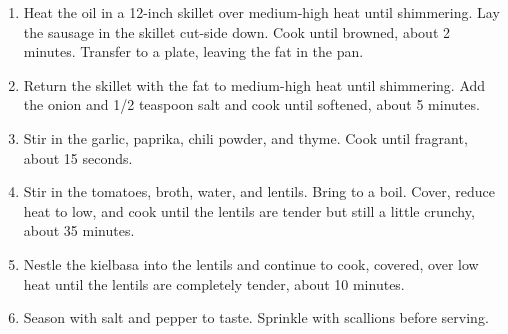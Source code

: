 \documentclass[letterpaper]{recipe}
\begin{document}

\begin{enumerate}
\addtolength{\itemindent}{2em}
\item Heat the oil in a 12-inch skillet over medium-high heat until shimmering.  Lay the sausage in the skillet cut-side down.  Cook until browned, about 2 minutes.  Transfer to a plate, leaving the fat in the pan.
\item Return the skillet with the fat to medium-high heat until shimmering.  Add the onion and 1/2 teaspoon salt and cook until softened, about 5 minutes.
\item Stir in the garlic, paprika, chili powder, and thyme.  Cook until fragrant, about 15 seconds.
\item Stir in the tomatoes, broth, water, and lentils.  Bring to a boil.  Cover, reduce heat to low, and cook until the lentils are tender but still a little crunchy, about 35 minutes.
\item Nestle the kielbasa into the lentils and continue to cook, covered, over low heat until the lentils are completely tender, about 10 minutes.
\item Season with salt and pepper to taste.  Sprinkle with scallions before serving.
\end{enumerate}
\end{document}
